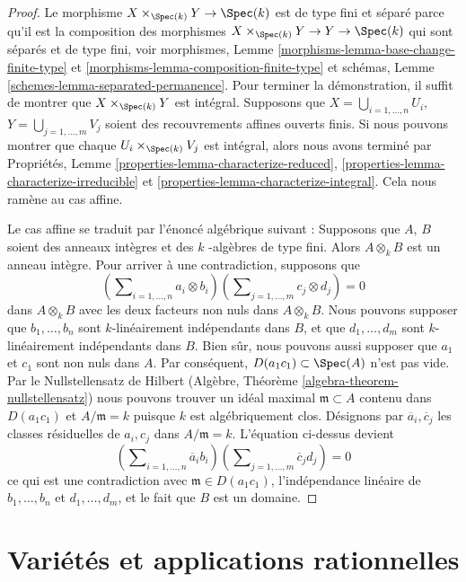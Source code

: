 \begin{proof}
Le morphisme $X \times_{\Spec(k)} Y \to \Spec(k)$
est de type fini et séparé parce qu'il est la
composition des morphismes $X \times_{\Spec(k)} Y
\to Y \to \Spec(k)$ qui sont séparés et de type
fini, voir morphismes, Lemme
\ref{morphisms-lemma-base-change-finite-type} et
\ref{morphisms-lemma-composition-finite-type} et
schémas, Lemme
\ref{schemes-lemma-separated-permanence}. Pour terminer
la démonstration, il suffit de montrer que $X
\times_{\Spec(k)} Y$ est intégral. Supposons que $X =
\bigcup_{i = 1, \ldots, n} U_i$, $Y = \bigcup_{j = 1,
\ldots, m} V_j$ soient des recouvrements affines ouverts
finis. Si nous pouvons montrer que chaque $U_i
\times_{\Spec(k)} V_j$ est intégral, alors nous avons terminé
par Propriétés, Lemme
\ref{properties-lemma-characterize-reduced},
\ref{properties-lemma-characterize-irreducible} et \ref{properties-lemma-characterize-integral}. Cela nous ramène au cas affine.

\medskip\noindent
Le cas affine se traduit par l'énoncé algébrique suivant : Supposons que $A$,
$B$ soient des anneaux intègres et des $k$ -algèbres de type fini. Alors $A
\otimes_k B$ est un anneau intègre. Pour arriver à une contradiction, supposons que
$$
(\sum\nolimits_{i = 1, \ldots, n} a_i \otimes b_i)
(\sum\nolimits_{j = 1, \ldots, m} c_j \otimes d_j) = 0
$$
dans $A \otimes_k B$ avec les deux facteurs non nuls dans $A
\otimes_k B$. Nous pouvons supposer que $b_1, \ldots, b_n$ sont
$k$-linéairement indépendants dans $B$, et que $d_1, \ldots, d_m$ sont
$k$-linéairement indépendants dans $B$. Bien sûr, nous pouvons aussi
supposer que $a_1$ et $c_1$ sont non nuls dans $A$. Par conséquent,
$D(a_1c_1) \subset \Spec(A)$ n'est pas vide. Par le Nullstellensatz de
Hilbert (Algèbre, Théorème \ref{algebra-theorem-nullstellensatz}) nous
pouvons trouver un idéal maximal $\mathfrak m \subset A$ contenu dans
$D(a_1c_1)$ et $A/\mathfrak m = k$ puisque $k$ est algébriquement
clos. Désignons par $\overline{a}_i, \overline{c}_j$ les classes
résiduelles de $a_i, c_j$ dans $A/\mathfrak m = k$. L'équation ci-dessus devient
$$
(\sum\nolimits_{i = 1, \ldots, n} \overline{a}_i b_i)
(\sum\nolimits_{j = 1, \ldots, m} \overline{c}_j d_j) = 0
$$
ce qui est une contradiction avec $\mathfrak m \in
D(a_1c_1)$, l'indépendance linéaire de $b_1, \ldots, b_n$
et $d_1, \ldots, d_m$, et le fait que $B$ est un domaine.
\end{proof}






\section{Variétés et applications rationnelles}
\label{section-varieties-rational-maps}

